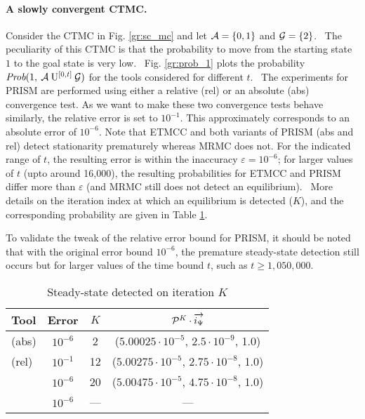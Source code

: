 \documentclass{entcs}
\begin{document}
	\paragraph{A slowly convergent CTMC. \label{ss:slow_conv}}
		Consider the CTMC in Fig. \ref{gr:sc_mc} and let $\mathcal{A} = \{0,1\}$ and $\mathcal{G} = \{2\}$.  The peculiarity of this CTMC is that the probability to move from the starting state $1$ to the goal state is very low.  Fig. \ref{gr:prob_1} plots the probability $\mbox{\it Prob}(1, \: \mathcal{A} \: \mathrm{U}^{[0,t]} \: \mathcal{G} )$ for the tools considered for different $t$.  The experiments for PRISM are performed using either a relative (rel) or an absolute (abs) convergence test. As we want to make these two convergence tests behave similarly, the relative error is set to $10^{-1}$. This approximately corresponds to an absolute error of $10^{-6}$. Note that ETMCC and both variants of PRISM (abs and rel) detect stationarity prematurely whereas MRMC does not. For the indicated range of $t$, the resulting error is within the inaccuracy $\varepsilon = 10^{{-}6}$; for larger values of $t$ (upto around 16,000), the resulting probabilities for ETMCC and PRISM differ more than $\varepsilon$ (and MRMC still does not detect an equilibrium).  More details on the iteration index at which an equilibrium is detected ($K$), and the corresponding probability are given in Table \ref{tb:ssd_points}.
		
		To validate the tweak of the relative error bound for PRISM, it should be noted that with the original error bound $10^{-6}$, the premature steady-state detection still occurs but for larger values of the time bound $t$, such as $t \geq 1,050,000$.
		
	\begin{table}[h]
	{\footnotesize
		\caption{Steady-state detected on iteration $K$}
		\begin{center}
			\begin{tabular}{|l|c|c|c|}
				\hline
				Tool 		& Error &	$K$	& $\mathcal{P}^{K} \cdot \overrightarrow{i_{\Psi}}$ \\
				\hline
				\prism (abs)	& $10^{-6}$ &	 2	&	($5.00025 \cdot 10^{-5}$, $2.5 \cdot 10^{-9}$, 1.0) \\
				\prism (rel)	& $10^{-1}$ &	12	&	($5.00275 \cdot 10^{-5}$, $2.75 \cdot 10^{-8}$, 1.0) \\
				\etmcc		& $10^{-6}$ &	20	&	($5.00475 \cdot 10^{-5}$, $4.75 \cdot 10^{-8}$, 1.0) \\
				\mrmc		& $10^{-6}$ & ---	&	---	 \\
				\hline
			\end{tabular}
		\end{center}
		\label{tb:ssd_points}
		\vspace{-0.3cm}
	}
	\end{table}
	
\end{document}
